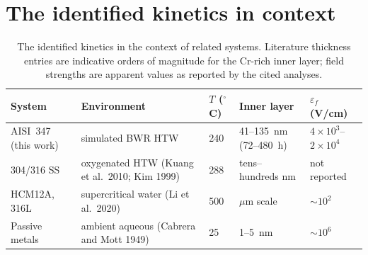 \section{The identified kinetics in context}
\label{sec:context}

\begin{table}[htbp]
\centering
\caption{The identified kinetics in the context of related systems.
Literature thickness entries are indicative orders of magnitude for the
Cr-rich inner layer; field strengths are apparent values as reported by
the cited analyses.}
\label{tab:context}
\scriptsize
\setlength{\tabcolsep}{4pt}
\begin{tabular}{lllll}
\toprule
System & Environment & $T$ ($^\circ$C) & Inner layer & $\varepsilon_f$ (V/cm) \\
\midrule
AISI~347 (this work) & simulated BWR HTW & 240 & 41--135~nm (72--480~h) & $4\times10^3$--$2\times10^4$ \\
304/316 SS & oxygenated HTW (Kuang et al.\ 2010; Kim 1999) & 288 & tens--hundreds nm & not reported \\
HCM12A, 316L & supercritical water (Li et al.\ 2020) & 500 & $\mu$m scale & $\sim10^2$ \\
Passive metals & ambient aqueous (Cabrera and Mott 1949) & 25 & 1--5~nm & $\sim10^6$ \\
\bottomrule
\end{tabular}
\end{table}
